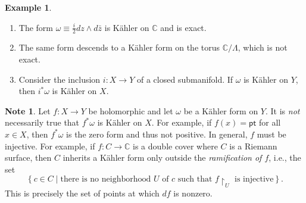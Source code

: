 \documentclass[10pt,letterpaper,cm]{nupset}
\theoremstyle{definition}
\newtheorem{exmp}[defn]{Example}
\newtheorem{note}[defn]{Note}
\theoremstyle{theorem}
\theoremstyle{remark}
\newcommand{\C}{\mathbb C}
\newcommand{\1}{\mathbb{1}}
\newcommand{\0}{\vec 0}
\newcommand{\pt}{\mathsf{pt}}
\newcommand{\be}{\begin{enumerate}}
\newcommand{\ee}{\end{enumerate}}
\begin{document}
\begin{exmp}\label{km1} $ $
\be
\item The form $\omega \equiv \frac{i}{2}d{z} \wedge d{\bar{z}}$ is K\"ahler on $\C$ and is exact.
\item The same form descends to a K\"ahler form on the torus $\C/\Lambda$, which is not exact. 
\item Consider the inclusion $i : X \to Y$ of a closed submanifold. If $\omega$ is K\"ahler on $Y$, then $i^{\ast}{\omega}$ is K\"ahler on $X$.
\ee
\end{exmp}

\begin{note}
Let $f: X \to Y$ be holomorphic and let $\omega$ be a K\"ahler form on $Y$. It is \emph{not} necessarily true that $f^{\ast}{\omega}$ is K\"ahler on $X$. For example, if $f(x) = \pt$ for all $x\in X$, then $f^{\ast}{\omega}$ is the zero form and thus not positive. 
In general,  $f$ must be injective. For example, if $f: C \to \C$ is a double cover where $C$ is a Riemann surface, then $C$ inherits a K\"ahler form only outside the  \textit{ramification of $f$}, i.e., the set $$\left\{c\in C \mid \text{there is no neighborhood } U \text{ of  } c \text{ such that } f\restriction_U \text{ is injective}\right\}.$$ This is precisely the set of points at which $d{f}$ is nonzero.
\end{note}
\end{document}
